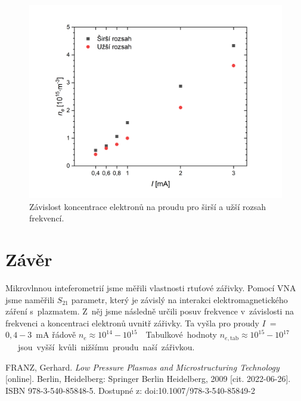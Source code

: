 \documentclass[a4paper,12pt]{article}
\begin{document}
\begin{figure}[h]
	\centering
	\includegraphics[width=0.9\linewidth]{koncnai.png}
	\caption{Závislost koncentrace elektronů na proudu pro širší a užší rozsah 
	frekvencí.}
	\label{koncnai}
\end{figure}

\clearpage
\section{Závěr}
\par Mikrovlnnou inteferometrií jsme měřili vlastnosti rtuťové zářivky. Pomocí 
VNA jsme naměřili $S_{21}$ parametr, který je závislý na interakci 
elektromagnetického záření s~plazmatem. Z~něj jsme následně určili posuv 
frekvence v~závislosti na frekvenci a koncentraci elektronů uvnitř zářivky. Ta 
vyšla pro proudy $I$~=~$0,4-3$~\si{\milli\ampere} řádově $n_e \approx 
10^{14}-10^{15}$~\si{\cubic\per\meter}. Tabulkové 
hodnoty $n_{e,\text{tab}} \approx 10^{15}-10^{17}$~\si{\cubic\per\meter} 
\cite{conc} jsou vyšší kvůli nižšímu proudu naší zářivkou.


\begin{thebibliography}{10}
	FRANZ, Gerhard. \textit{Low Pressure Plasmas and Microstructuring 
	Technology} 
	[online]. Berlin, Heidelberg: Springer Berlin Heidelberg, 2009 [cit. 
	2022-06-26]. ISBN 978-3-540-85848-5. Dostupné z: 
	doi:10.1007/978-3-540-85849-2
\end{thebibliography}
\end{document}
